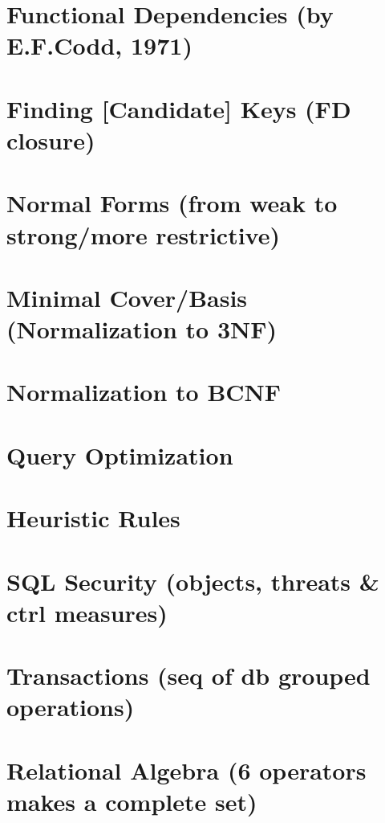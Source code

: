 \documentclass[8pt,a4paper,landscape]{extarticle}
\begin{document}
\pagestyle{empty}
\setlength{\abovedisplayskip}{1pt}
\setlength{\belowdisplayskip}{1pt}
\setlength{\abovedisplayshortskip}{0pt}
\setlength{\belowdisplayshortskip}{0pt}
\begin{multicols*}{3}
\section*{Functional Dependencies (by E.F.Codd, 1971)}

\section*{Finding [Candidate] Keys (FD closure)}

\section*{Normal Forms (from weak to strong/more restrictive)}

\section*{Minimal Cover/Basis (Normalization to 3NF)}

\section*{Normalization to BCNF}

\section*{Query Optimization}

\section*{Heuristic Rules}

\section*{SQL Security (objects, threats \& ctrl measures)}

\section*{Transactions (seq of db grouped operations)}

\section*{Relational Algebra (6 operators makes a complete set)}


\end{multicols*}
\end{document}

